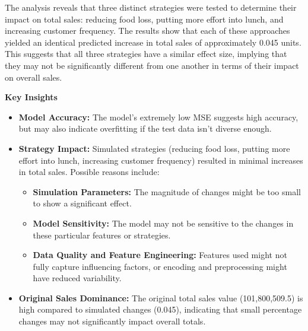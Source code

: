 The analysis reveals that three distinct strategies were tested to determine their impact on total sales: reducing food loss, putting more effort into lunch, and increasing customer frequency. The results show that each of these approaches yielded an identical predicted increase in total sales of approximately 0.045 units. This suggests that all three strategies have a similar effect size, implying that they may not be significantly different from one another in terms of their impact on overall sales.

\textbf{Key Insights}

\begin{itemize}
	\item \textbf{Model Accuracy:} The model's extremely low MSE suggests high accuracy, but may also indicate overfitting if the test data isn't diverse enough.
	\item \textbf{Strategy Impact:} Simulated strategies (reducing food loss, putting more effort into lunch, increasing customer frequency) resulted in minimal increases in total sales. Possible reasons include:
	\begin{itemize}
		\item \textbf{Simulation Parameters:} The magnitude of changes might be too small to show a significant effect.
		\item \textbf{Model Sensitivity:} The model may not be sensitive to the changes in these particular features or strategies.
		\item \textbf{Data Quality and Feature Engineering:} Features used might not fully capture influencing factors, or encoding and preprocessing might have reduced variability.
	\end{itemize}
	\item \textbf{Original Sales Dominance:} The original total sales value (101,800,509.5) is high compared to simulated changes (0.045), indicating that small percentage changes may not significantly impact overall totals.
\end{itemize}










